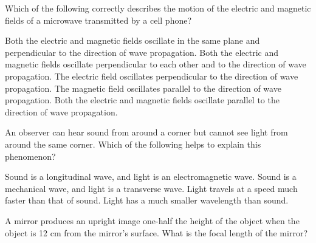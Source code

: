 \documentclass{../../oss-apphys-exam}
\begin{document}


\begin{questions}
  \classkickMCinstructions

  \question Which of the following correctly describes the motion of the
  electric and magnetic fields of a microwave transmitted by a cell phone?
  \begin{choices}
    \choice Both the electric and magnetic fields oscillate in the same plane
    and perpendicular to the direction of wave propagation.
    \choice Both the electric and magnetic fields oscillate perpendicular to
    each other and to the direction of wave propagation.
    \choice The electric field oscillates perpendicular to the direction of wave
    propagation. The magnetic field oscillates parallel to the direction
    of wave propagation.
    \choice Both the electric and magnetic fields oscillate parallel to the
    direction of wave propagation.
  \end{choices}
  
  \question An observer can hear sound from around a corner but cannot see light
  from around the same corner. Which of the following helps to explain this
  phenomenon?
  \begin{choices}
    \choice Sound is a longitudinal wave, and light is an electromagnetic wave.
    \choice Sound is a mechanical wave, and light is a transverse wave.
    \choice Light travels at a speed much faster than that of sound.
    \choice Light has a much smaller wavelength than sound.
  \end{choices}
    
  \question A mirror produces an upright image one-half the height of the object
  when the object is 12 cm from the mirror's surface. What is the focal
  length of the mirror?


\end{questions}
\end{document}
